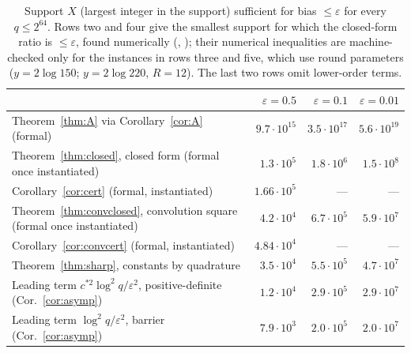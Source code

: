 \begin{table}[ht]
\centering
\begin{tabular}{lrrr}
\toprule
 & $\varepsilon=0.5$ & $\varepsilon=0.1$ & $\varepsilon=0.01$\\
\midrule
Theorem~\ref{thm:A} via Corollary~\ref{cor:A} (formal) & $9.7\cdot10^{15}$ & $3.5\cdot10^{17}$ & $5.6\cdot10^{19}$\\
Theorem~\ref{thm:closed}, closed form (formal once instantiated) & $1.3\cdot10^{5}$ & $1.8\cdot10^{6}$ & $1.5\cdot10^{8}$\\
Corollary~\ref{cor:cert} (formal, instantiated) & $1.66\cdot10^{5}$ & --- & ---\\
Theorem~\ref{thm:convclosed}, convolution square (formal once instantiated) & $4.2\cdot10^{4}$ & $6.7\cdot10^{5}$ & $5.9\cdot10^{7}$\\
Corollary~\ref{cor:convcert} (formal, instantiated) & $4.84\cdot10^{4}$ & --- & ---\\
Theorem~\ref{thm:sharp}, constants by quadrature & $3.5\cdot10^{4}$ & $5.5\cdot10^{5}$ & $4.7\cdot10^{7}$\\
Leading term $c^{*2}\log^2q/\varepsilon^2$, positive-definite (Cor.~\ref{cor:asymp}) & $1.2\cdot10^{4}$ & $2.9\cdot10^{5}$ & $2.9\cdot10^{7}$\\
Leading term $\log^2q/\varepsilon^2$, barrier (Cor.~\ref{cor:asymp}) & $7.9\cdot10^{3}$ & $2.0\cdot10^{5}$ & $2.0\cdot10^{7}$\\
\bottomrule
\end{tabular}
\caption{Support $X$ (largest integer in the support) sufficient for bias $\le\varepsilon$ for every $q\le2^{64}$.
Rows two and four give the smallest support for which the closed-form ratio is $\le\varepsilon$, found numerically
(, ); their numerical inequalities are machine-checked only for the
instances in rows three and five, which use round parameters ($y=2\log150$; $y=2\log220$, $R=12$). The last two rows omit
lower-order terms.}\label{tab:params}
\end{table}
